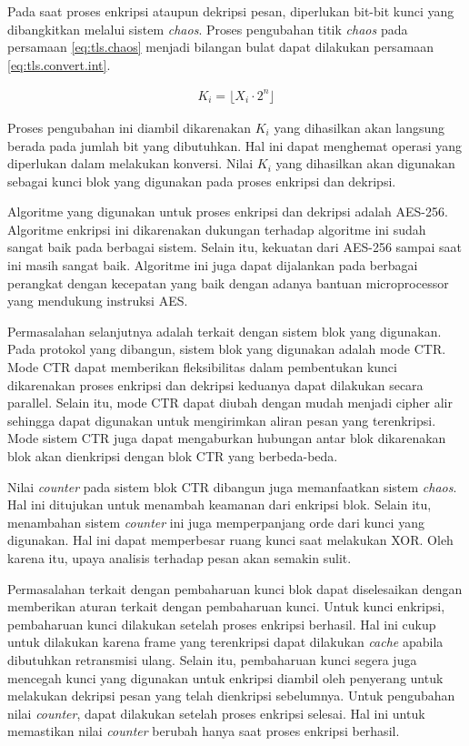 Pada saat proses enkripsi ataupun dekripsi pesan, diperlukan bit-bit kunci yang dibangkitkan melalui sistem \emph{chaos}. Proses pengubahan titik \emph{chaos} pada persamaan \ref{eq:tls.chaos} menjadi bilangan bulat dapat dilakukan persamaan \ref{eq:tls.convert.int}.

\begin{equation}
  \begin{aligned}
    K_i = \lfloor{X_i \cdot 2^{n}}\rfloor
  \end{aligned}
  \label{eq:tls.convert.int}
\end{equation}

Proses pengubahan ini diambil dikarenakan $K_i$ yang dihasilkan akan langsung berada pada jumlah bit yang dibutuhkan. Hal ini dapat menghemat operasi yang diperlukan dalam melakukan konversi. Nilai $K_i$ yang dihasilkan akan digunakan sebagai kunci blok yang digunakan pada proses enkripsi dan dekripsi.

Algoritme yang digunakan untuk proses enkripsi dan dekripsi adalah AES-256. Algoritme enkripsi ini dikarenakan dukungan terhadap algoritme ini sudah sangat baik pada berbagai sistem. Selain itu, kekuatan dari AES-256 sampai saat ini masih sangat baik. Algoritme ini juga dapat dijalankan pada berbagai perangkat dengan kecepatan yang baik dengan adanya bantuan microprocessor yang mendukung instruksi AES.

Permasalahan selanjutnya adalah terkait dengan sistem blok yang digunakan. Pada protokol yang dibangun, sistem blok yang digunakan adalah mode CTR. Mode CTR dapat memberikan fleksibilitas dalam pembentukan kunci dikarenakan proses enkripsi dan dekripsi keduanya dapat dilakukan secara parallel. Selain itu, mode CTR dapat diubah dengan mudah menjadi cipher alir sehingga dapat digunakan untuk mengirimkan aliran pesan yang terenkripsi. Mode sistem CTR juga dapat mengaburkan hubungan antar blok dikarenakan blok akan dienkripsi dengan blok CTR yang berbeda-beda.

Nilai \emph{counter} pada sistem blok CTR dibangun juga memanfaatkan sistem \emph{chaos}. Hal ini ditujukan untuk menambah keamanan dari enkripsi blok. Selain itu, menambahan sistem \emph{counter} ini juga memperpanjang orde dari kunci yang digunakan. Hal ini dapat memperbesar ruang kunci saat melakukan XOR. Oleh karena itu, upaya analisis terhadap pesan akan semakin sulit.

Permasalahan terkait dengan pembaharuan kunci blok dapat diselesaikan dengan memberikan aturan terkait dengan pembaharuan kunci. Untuk kunci enkripsi, pembaharuan kunci dilakukan setelah proses enkripsi berhasil. Hal ini cukup untuk dilakukan karena frame yang terenkripsi dapat dilakukan \emph{cache} apabila dibutuhkan retransmisi ulang. Selain itu, pembaharuan kunci segera juga mencegah kunci yang digunakan untuk enkripsi diambil oleh penyerang untuk melakukan dekripsi pesan yang telah dienkripsi sebelumnya. Untuk pengubahan nilai \emph{counter}, dapat dilakukan setelah proses enkripsi selesai. Hal ini untuk memastikan nilai \emph{counter} berubah hanya saat proses enkripsi berhasil. 


